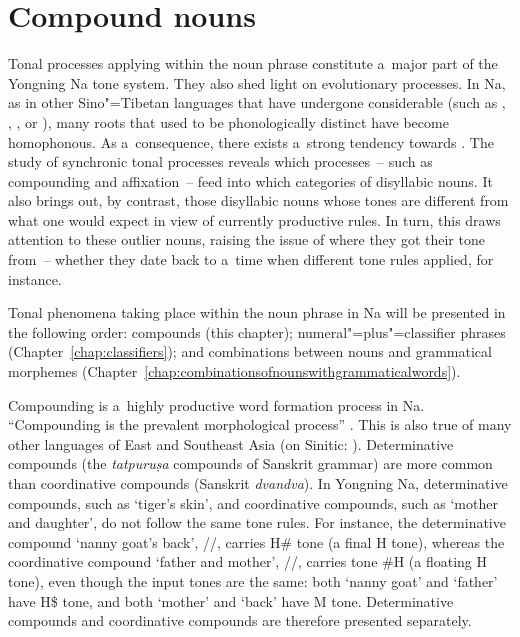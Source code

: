 \chapter{Compound nouns}
\label{chap:compoundnouns}


Tonal processes applying within the noun phrase constitute a~major part of the Yongning Na tone
system. They also shed light on evolutionary processes. In Na, as in other {Sino"=Tibetan} languages
that have undergone considerable  (such as  ,  ,  , or  ), many
roots that used to be phonologically distinct have become homophonous. As a~consequence, there
exists a~strong tendency towards . The study of synchronic tonal processes reveals which processes~-- such as compounding and {affixation}~-- feed into which categories of
disyllabic nouns. It also brings out, by contrast, those disyllabic nouns whose tones are different from what one would expect in view of currently productive rules. In turn, this draws attention to these
outlier nouns, raising the issue of where they got their tone from~-- whether they date back to
a~time when different tone rules applied, for instance.

Tonal phenomena taking place within the noun phrase in Na will be presented in the following order:
compounds (this chapter); {numeral}"=plus"=classifier phrases (Chapter~\ref{chap:classifiers}); and combinations between
nouns and grammatical morphemes (Chapter~\ref{chap:combinationsofnounswithgrammaticalwords}).

Compounding is a~highly productive word formation process in Na. “Compounding is the
prevalent morphological process” \citep[344]{lidz2010}. This is also true of many other languages of East and Southeast Asia (on {Sinitic}: \citealt[passim]{arcodia2012}). Determinative compounds (the \textit{tatpuruṣa} compounds of Sanskrit grammar) are
more common than coordinative compounds (Sanskrit \textit{dvandva}). In Yongning Na,
determinative compounds, such as ‘tiger’s skin’, and coordinative compounds, such as ‘mother and
daughter’, do not follow the same tone rules. For instance, the determinative compound ‘nanny goat’s
back’, //, carries H\# tone (a final H tone), whereas the coordinative compound
‘father and mother’, //, carries tone \#H (a floating H tone), even though the
input tones are the same: both ‘nanny goat’ and ‘father’ have H\$ tone, and both ‘mother’ and ‘back’
have M tone. Determinative compounds and coordinative compounds are therefore presented separately.



